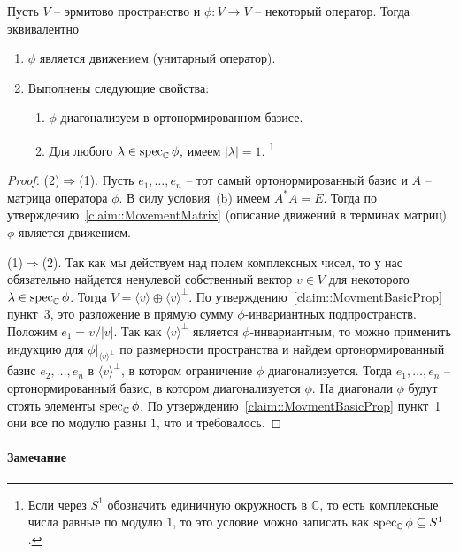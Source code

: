 \begin{claim}
\label{claim::HermMoveClassific}
Пусть $V$ -- эрмитово пространство и $\phi\colon V\to V$ -- некоторый оператор.
Тогда эквивалентно
\begin{enumerate}
\item $\phi$ является движением (унитарный оператор).

\item Выполнены следующие свойства:
\begin{enumerate}
\item $\phi$ диагонализуем в ортонормированном базисе.

\item Для любого $\lambda\in\operatorname{spec}_\mathbb C\phi$, имеем $|\lambda| = 1$.%
\footnote{Если через $S^1$ обозначить единичную окружность в $\mathbb C$, то есть комплексные числа равные по модулю $1$, то это условие можно записать как $\operatorname{spec}_\mathbb C\phi \subseteq S^1$.}
\end{enumerate}
\end{enumerate}
\end{claim}
\begin{proof}
(2)$\Rightarrow$(1).
Пусть $e_1,\ldots,e_n$ -- тот самый ортонормированный базис и $A$ -- матрица оператора $\phi$.
В силу условия~(b) имеем $A^*A = E$.
Тогда по утверждению~\ref{claim::MovementMatrix} (описание движений в терминах матриц) $\phi$ является движением.

(1)$\Rightarrow$(2).
Так как мы действуем над полем комплексных чисел, то у нас обязательно найдется ненулевой собственный вектор $v\in V$ для некоторого $\lambda\in\operatorname{spec}_\mathbb C\phi$.
Тогда $V = \langle v\rangle \oplus \langle v\rangle^\bot$.
По утверждению~\ref{claim::MovmentBasicProp} пункт~3, это разложение в прямую сумму $\phi$-инвариантных подпространств.
Положим $e_1 = v/|v|$.
Так как $\langle v\rangle^\bot$ является $\phi$-инвариантным, то можно применить индукцию для $\phi|_{\langle v \rangle^\bot}$  по размерности пространства и найдем ортонормированный базис $e_2,\ldots,e_n$ в $\langle v\rangle^\bot$, в котором ограничение $\phi$ диагонализуется.
Тогда $e_1,\ldots,e_n$ -- ортонормированный базис, в котором диагонализуется $\phi$.
На диагонали $\phi$ будут стоять элементы $\operatorname{spec}_\mathbb C\phi$.
По утверждению~\ref{claim::MovmentBasicProp} пункт~1 они все по модулю равны $1$, что и требовалось.
\end{proof}

\paragraph{Замечание}

